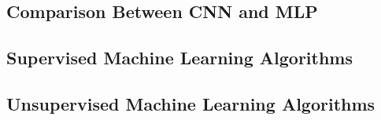 \subsection{Comparison Between CNN and MLP}\label{cnn_vs_mlp}

\subsection{Supervised Machine Learning Algorithms}\label{sml}



\subsection{Unsupervised Machine Learning Algorithms}\label{uml}


